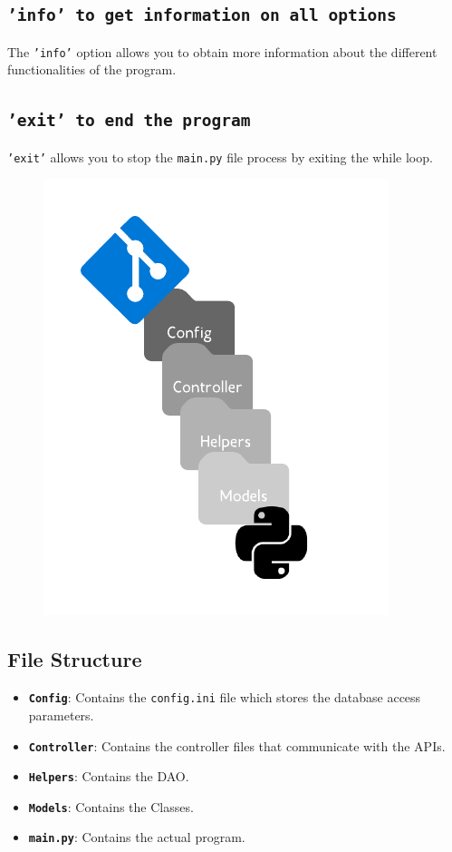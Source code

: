 \documentclass[11pt,a4paper,notitlepage]{article}
\begin{document}
\subsection*{\texttt{'info' to get information on all options}}
The \texttt{'info'} option allows you to obtain more information about the different functionalities of the program.
  
\subsection*{\texttt{'exit' to end the program}}
\texttt{'exit'} allows you to stop the \texttt{main.py} file process by exiting the while loop.
\begin{figure}
  \begin{center}
    \includegraphics[scale = 1.2]{file_structure.png}
  \end{center}
\end{figure}

\subsection*{File Structure}
\par
\begin{itemize}
\item \textbf{\texttt{Config}}: Contains the \texttt{config.ini} file which stores the database access parameters.
\item \textbf{\texttt{Controller}}: Contains the controller files that communicate with the APIs.
\item \textbf{\texttt{Helpers}}: Contains the DAO. 
\item \textbf{\texttt{Models}}: Contains the Classes.
\item \textbf{\texttt{main.py}}: Contains the actual program.
\end{itemize}
\newpage
\end{document}
